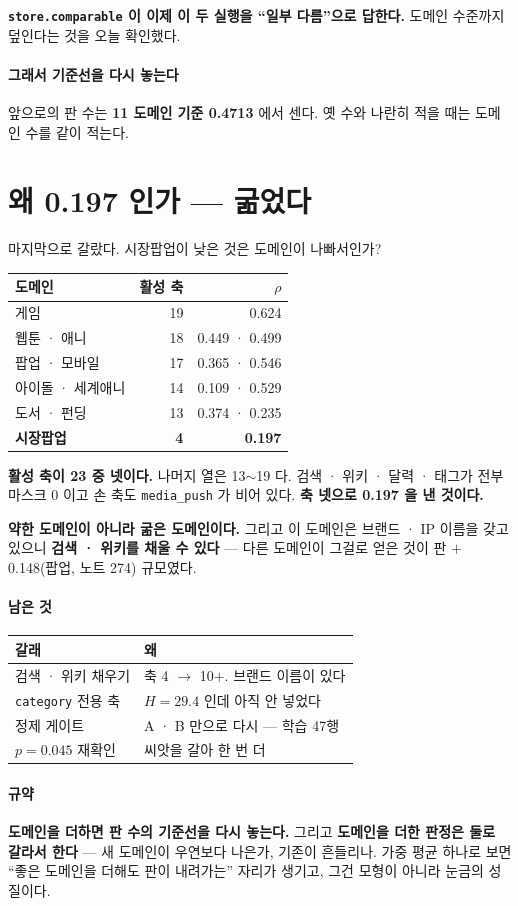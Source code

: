 \documentclass[10pt]{article}
\begin{document}
\textbf{\texttt{store.comparable} 이 이제 이 두 실행을 ``일부 다름''으로
답한다.} 도메인 수준까지 덮인다는 것을 오늘 확인했다.

\paragraph{그래서 기준선을 다시 놓는다} 앞으로의 판 수는 \textbf{11 도메인
기준 0.4713} 에서 센다. 옛 수와 나란히 적을 때는 도메인 수를 같이 적는다.

\section{왜 0.197 인가 --- 굶었다}

마지막으로 갈랐다. 시장팝업이 낮은 것은 도메인이 나빠서인가?

\begin{center}\small
\begin{tabular}{lrr}
\hline
도메인 & 활성 축 & $\rho$ \\
\hline
게임 & 19 & 0.624 \\
웹툰 · 애니 & 18 & 0.449 · 0.499 \\
팝업 · 모바일 & 17 & 0.365 · 0.546 \\
아이돌 · 세계애니 & 14 & 0.109 · 0.529 \\
도서 · 펀딩 & 13 & 0.374 · 0.235 \\
\textbf{시장팝업} & \textbf{4} & \textbf{0.197} \\
\hline
\end{tabular}
\end{center}

\textbf{활성 축이 23 중 넷이다.} 나머지 열은 13$\sim$19 다. 검색 · 위키 ·
달력 · 태그가 전부 마스크 0 이고 손 축도 \texttt{media\_push} 가 비어 있다.
\textbf{축 넷으로 0.197 을 낸 것이다.}

\textbf{약한 도메인이 아니라 굶은 도메인이다.} 그리고 이 도메인은 브랜드 ·
IP 이름을 갖고 있으니 \textbf{검색 · 위키를 채울 수 있다} --- 다른 도메인이
그걸로 얻은 것이 판 $+$0.148(팝업, 노트 274) 규모였다.

\paragraph{남은 것}
\begin{center}\small
\begin{tabular}{ll}
\hline
갈래 & 왜 \\
\hline
검색 · 위키 채우기 & 축 4 $\to$ 10$+$. 브랜드 이름이 있다 \\
\texttt{category} 전용 축 & $H{=}29.4$ 인데 아직 안 넣었다 \\
정제 게이트 & A · B 만으로 다시 --- 학습 47행 \\
$p{=}0.045$ 재확인 & 씨앗을 갈아 한 번 더 \\
\hline
\end{tabular}
\end{center}

\paragraph{규약} \textbf{도메인을 더하면 판 수의 기준선을 다시 놓는다.}
그리고 \textbf{도메인을 더한 판정은 둘로 갈라서 한다} --- 새 도메인이 우연보다
나은가, 기존이 흔들리나. 가중 평균 하나로 보면 ``좋은 도메인을 더해도 판이
내려가는'' 자리가 생기고, 그건 모형이 아니라 눈금의 성질이다.
\end{document}
